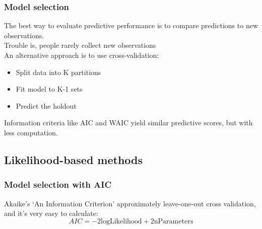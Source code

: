 \documentclass[color=usenames,dvipsnames]{beamer}\usepackage[]{graphicx}\usepackage[]{color}
\begin{document}
\begin{frame}
  \frametitle{Model selection}
  The best way to evaluate predictive performance is to compare
  predictions to new observations. \\
  \pause
  \vfill
  Trouble is, people rarely collect new observations \\
  \pause
  \vfill
  An alternative approach is to use cross-validation:
  \begin{itemize}
    \item Split data into K partitions
    \item Fit model to K-1 sets
    \item Predict the holdout
  \end{itemize}
  \pause
  \vfill
  Information criteria like AIC and WAIC yield similar predictive
  scores, but with less computation.    
\end{frame}



\subsection{Likelihood-based methods}



\begin{frame}
  \frametitle{Model selection with AIC}
  Akaike's `An Information Criterion' approximately leave-one-out
  cross validation, and it's very easy to calculate:
  \[
     AIC = -2\mathrm{logLikelihood} + 2\mathrm{nParameters}
  \]
\end{frame}
\end{document}
